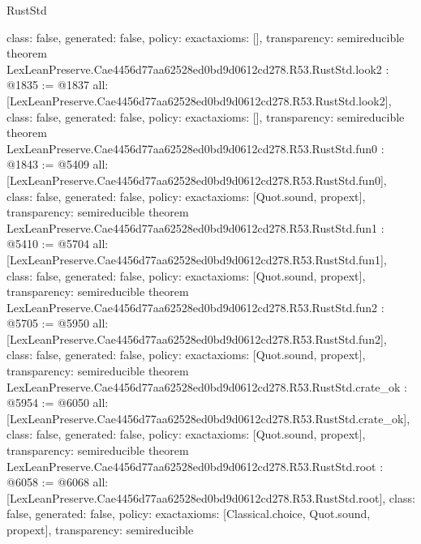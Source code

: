 \begin{lexlean}{RustStd}
\begin{coremodule}
{  class: false,
  generated: false,
  policy: exact{axioms: []},
  transparency: semireducible
}
theorem LexLeanPreserve.Cae4456d77aa62528ed0bd9d0612cd278.R53.RustStd.look2 : @1835 := @1837 {
  all: [LexLeanPreserve.Cae4456d77aa62528ed0bd9d0612cd278.R53.RustStd.look2],
  class: false,
  generated: false,
  policy: exact{axioms: []},
  transparency: semireducible
}
theorem LexLeanPreserve.Cae4456d77aa62528ed0bd9d0612cd278.R53.RustStd.fun0 : @1843 := @5409 {
  all: [LexLeanPreserve.Cae4456d77aa62528ed0bd9d0612cd278.R53.RustStd.fun0],
  class: false,
  generated: false,
  policy: exact{axioms: [Quot.sound, propext]},
  transparency: semireducible
}
theorem LexLeanPreserve.Cae4456d77aa62528ed0bd9d0612cd278.R53.RustStd.fun1 : @5410 := @5704 {
  all: [LexLeanPreserve.Cae4456d77aa62528ed0bd9d0612cd278.R53.RustStd.fun1],
  class: false,
  generated: false,
  policy: exact{axioms: [Quot.sound, propext]},
  transparency: semireducible
}
theorem LexLeanPreserve.Cae4456d77aa62528ed0bd9d0612cd278.R53.RustStd.fun2 : @5705 := @5950 {
  all: [LexLeanPreserve.Cae4456d77aa62528ed0bd9d0612cd278.R53.RustStd.fun2],
  class: false,
  generated: false,
  policy: exact{axioms: [Quot.sound, propext]},
  transparency: semireducible
}
theorem LexLeanPreserve.Cae4456d77aa62528ed0bd9d0612cd278.R53.RustStd.crate_ok : @5954 := @6050 {
  all: [LexLeanPreserve.Cae4456d77aa62528ed0bd9d0612cd278.R53.RustStd.crate_ok],
  class: false,
  generated: false,
  policy: exact{axioms: [Quot.sound, propext]},
  transparency: semireducible
}
theorem LexLeanPreserve.Cae4456d77aa62528ed0bd9d0612cd278.R53.RustStd.root : @6058 := @6068 {
  all: [LexLeanPreserve.Cae4456d77aa62528ed0bd9d0612cd278.R53.RustStd.root],
  class: false,
  generated: false,
  policy: exact{axioms: [Classical.choice, Quot.sound, propext]},
  transparency: semireducible
}


\end{coremodule}
\end{lexlean}
